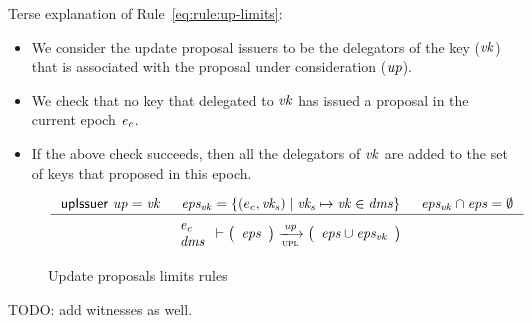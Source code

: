 Terse explanation of Rule~\ref{eq:rule:up-limits}:
\begin{itemize}
\item We consider the update proposal issuers to be the delegators of the key
  ($\mathit{vk}$) that is associated with the proposal under consideration
  ($\mathit{up}$).
\item We check that no key that delegated to $\mathit{vk}$ has issued a proposal
  in the current epoch $\mathit{e_c}$.
\item If the above check succeeds, then all the delegators of $\mathit{vk}$ are
  added to the set of keys that proposed in this epoch.
\end{itemize}

\begin{figure}[htb]
  \begin{equation}
    \label{eq:rule:up-limits}
    \inference
    {\upIssuer{up} = \var{vk}
      & \var{eps_{vk}} = \{ (e_c, \var{vk_s})
                       \mid \var{vk_s} \mapsto \var{vk} \in \var{dms}\}
      & \var{eps_{vk}} \cap \var{eps} = \emptyset
    }
    {
      {\begin{array}{l}
         \var{e_c}\\
         \var{dms}
       \end{array}
      }
      \vdash
      {
        \left(
          \begin{array}{l}
            \var{eps}
          \end{array}
        \right)
      }
      \trans{upl}{\var{up}}
      {
        \left(
          \begin{array}{l}
            \var{eps} \cup \var{eps_{vk}}
          \end{array}
        \right)
      }
    }
  \end{equation}
  \caption{Update proposals limits rules}
  \label{fig:rules:up-limits}
\end{figure}

\begin{todo}
TODO: add witnesses as well.
\end{todo}

